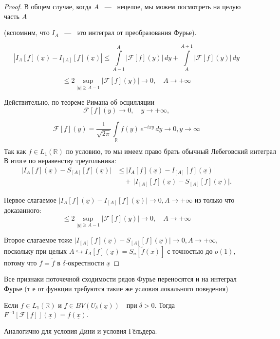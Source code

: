 \begin{proof}
В общем случае, когда $A$ ~---~ нецелое, мы можем посмотреть на целую часть $A$

(вспомним, что $I_A$ ~---~ это интеграл от преобразования Фурье).

\[
\left| I_A \left[ f \right] (\underline{x}) - I_{[A]} \left[ f \right] (\underline{x}) \right|
\leq
\int\limits_{A-1}^{A} \left| \mathcal{F} [f](y) \right| \, dy +
\int\limits_{A}^{A+1} \left| \mathcal{F} [f](y) \right| \, dy
\]

\[
\leq 2 \sup_{|y| \geq A-1} \left| \mathcal{F} [f](y) \right| \longrightarrow 0, \quad A \rightarrow +\infty
\]

Действительно, по теореме Римана об осцилляции
\[
\mathcal{F} \left[ f \right](y) \longrightarrow 0, \quad y \rightarrow +\infty,
\]

\[
\mathcal{F} \left[ f \right](y)  = \frac{1}{\sqrt{2 \pi}} \int\limits_{\mathbb{R}} f(y) \, e^{-ixy} \, dy \longrightarrow 0, y \longrightarrow \infty
\]

\[
\text{Так как }  f \in L_1(\mathbb{R}) \text{ по условию, то мы имеем право брать обычный Лебеговский интеграл}
\]
В итоге по неравенству треугольника:
\[
\begin{aligned}
\bigl|I_{A}[f](\underline{x}) - S_{[A]}[f](\underline{x})\bigr|
&\le
\bigl|I_{A}[f](\underline{x}) - I_{[A]}[f](\underline{x})\bigr|\\
&\quad
+\,\bigl|I_{[A]}[f](\underline{x}) - S_{[A]}[f](\underline{x})\bigr|.
\end{aligned}
\]

Первое слагаемое $\bigl|I_{A}[f](\underline{x}) - I_{[A]}[f](\underline{x})\bigr| \rightarrow
 0, A \rightarrow +\infty$ из только что доказанного:
 \[
\leq 2 \sup_{|y| \geq A-1} \left| \mathcal{F} [f](y) \right| \longrightarrow 0, \quad A \rightarrow +\infty
\]

Второе слагаемое тоже $\bigl|I_{[A]}[f](\underline{x}) - S_{[A]}[f](\underline{x})\bigr| \rightarrow 0, A \rightarrow +\infty$, поскольку при целых $A \hookrightarrow I_A[f](\underline{x}) = S_n[\widetilde{f}(x)]$ с точностью до $o(1)$, потому что $f = \widetilde{f}$ в $\delta$-окрестности $\underline{x}$
\end{proof}

\begin{corollary}
Все признаки поточечной сходимости рядов Фурье переносятся и на интеграл Фурье (т е от функции требуются такие же условия локального поведения)
\end{corollary}

\begin{example}
Если \( f \in L_1(\mathbb{R}) \) и
$f \in BV(U_{\delta}(\underline{x})) \quad \text{при} \; \delta > 0.$
Тогда
$F^{-1}\left[\mathcal{F}[f]\right](\underline{x}) = f(\underline{x}).$

Аналогично для условия Дини и условия Гёльдера.

\end{example}





